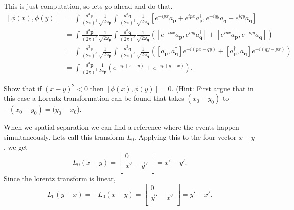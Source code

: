 \documentclass[working, oneside]{../../Preambles/tuftebook}
\begin{document}
This is just computation, so lets go ahead and do that.
\begin{align*}
    \left[ \phi \left( x \right) ,\phi \left( y \right)  \right] &= 
    \int \frac{d^3\mathbf{p}}{\left( 2\pi \right) ^{3}} \frac{1}{\sqrt{ 2\omega_{\mathbf{p}}}} \int \frac{d^3\mathbf{q}}{\left( 2\pi \right) ^{3}} \frac{1}{\sqrt{ 2\omega_{\mathbf{q}}}} \left[ e^{-ipx}a_{\mathbf{p}}+e^{ipx}a_{\mathbf{p}}^\dagger  ,   e^{-iqy}a_{\mathbf{q}}+e^{iqy }a_{\mathbf{q}}^\dagger \right]\\
    &=\int \frac{d^3\mathbf{p}}{\left( 2\pi \right) ^{3}} \frac{1}{\sqrt{ 2\omega_{\mathbf{p}}}} \int \frac{d^3\mathbf{q}}{\left( 2\pi \right) ^{3}} \frac{1}{\sqrt{ 2\omega_{\mathbf{q}}}} \left(   \left[ e^{-ipx}a_{\mathbf{p}}  ,   e^{iqy }a_{\mathbf{q}}^\dagger \right] + \left[   e^{ipx}a_{\mathbf{p}}^\dagger,e^{-iqy}a_{\mathbf{q}} \right]\right) \\
    &=\int \frac{d^3\mathbf{p}}{\left( 2\pi \right) ^{3}} \frac{1}{\sqrt{ 2\omega_{\mathbf{p}}}} \int \frac{d^3\mathbf{q}}{\left( 2\pi \right) ^{3}} \frac{1}{\sqrt{ 2\omega_{\mathbf{q}}}} \left(   \left[ a_{\mathbf{p}}  ,   a_{\mathbf{q}}^\dagger \right]e^{-i(px -qy)} + \left[   a_{\mathbf{p}}^\dagger,a_{\mathbf{q}} \right]e^{-i(qy-px)}\right)\\ 
    &=\int \frac{d^3\mathbf{p}}{\left( 2\pi \right) ^{3}} \frac{1}{ 2\omega_{\mathbf{p}}} \left(e^{-ip(x -y)} +e^{-ip(y-x)}\right) 
.\end{align*}
\begin{exercise}[3]
Show that if $(x - y)^2 < 0$ then $\left[ \phi(x), \phi(y) \right] = 0$. (Hint: First argue that in this case a Lorentz transformation can be found that takes $(x_0 - y_0)$ to $-(x_0 - y_0) = (y_0 - x_0$).
\end{exercise}
When we spatial separation we can find a reference where the events happen simultaneously. Lets call this transform $L_{0}$. Applying this to the four vector $x-y$, we get
 \[
L_{0}\left( x-y \right) =
\begin{bmatrix}
    0 \\
    \vec{x}' - \vec{y}' \\
\end{bmatrix} = x' -y'
.\] 
Since the lorentz transform is linear,
\[
L_0 \left( y-x \right) = -L_0\left( x- y \right) =
\begin{bmatrix}
    0 \\
    \vec{y}' - \vec{x}' \\
\end{bmatrix} = y' - x'
.\] 
\end{document}
